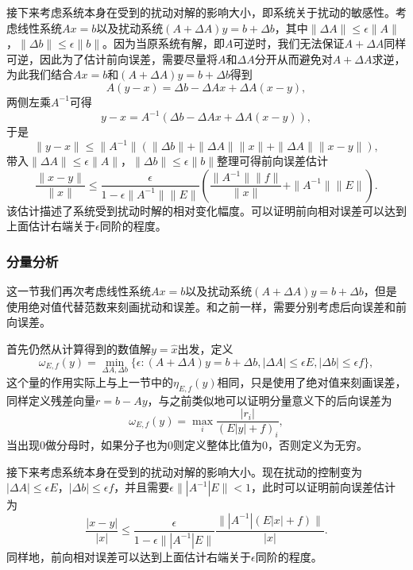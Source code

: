 \documentclass[a4paper,10pt]{ctexart}
\begin{document}
接下来考虑系统本身在受到的扰动对解的影响大小，即系统关于扰动的敏感性。考虑线性系统$ Ax=b $以及扰动系统$ (A+\Delta A)y = b + \Delta b $，其中$ \| \Delta A \| \leqslant \epsilon \| A \| $，$ \| \Delta b \| \leqslant \epsilon \| b \| $。因为当原系统有解，即$ A $可逆时，我们无法保证$ A+\Delta A $同样可逆，因此为了估计前向误差，需要尽量将$ A $和$ \Delta A $分开从而避免对$ A+\Delta A $求逆，为此我们结合$ Ax=b $和$ (A+\Delta A)y = b + \Delta b $得到
\[
    A(y-x) = \Delta b - \Delta A x + \Delta A (x-y),
\]
两侧左乘$ A^{-1} $可得
\[
    y-x = A^{-1}(\Delta b - \Delta A x + \Delta A (x-y)),
\]
于是
\[
    \| y-x \| \leqslant \| A^{-1} \| (\| \Delta b \| + \| \Delta A \| \| x \| + \| \Delta A \| \| x-y \|),  
\]
带入$ \| \Delta A \| \leqslant \epsilon \| A \| $，$ \| \Delta b \| \leqslant \epsilon \| b \| $整理可得前向误差估计
\begin{equation}
    \frac{\| x-y \|}{\| x \| } \leqslant \frac{\epsilon}{1-\epsilon \| A^{-1} \| \| E \|} \left( \frac{\| A^{-1} \| \| f \|}{\| x \|} + \| A^{-1} \| \| E \| \right).
\end{equation}
该估计描述了系统受到扰动时解的相对变化幅度。可以证明前向相对误差可以达到上面估计右端关于$ \epsilon $同阶的程度。

\subsubsection{分量分析}
这一节我们再次考虑线性系统$ Ax=b $以及扰动系统$ (A+\Delta A)y = b + \Delta b $，但是使用绝对值代替范数来刻画扰动和误差。和之前一样，需要分别考虑后向误差和前向误差。

首先仍然从计算得到的数值解$ y=\hat{x} $出发，定义
\begin{equation}
    \omega_{E,f}(y) = \min_{\Delta A, \Delta b}\{ \epsilon: (A+\Delta A)y = b+\Delta b, | \Delta A | \leqslant \epsilon E , | \Delta b | \leqslant \epsilon f \},
\end{equation}
这个量的作用实际上与上一节中的$ \eta_{E,f}(y) $相同，只是使用了绝对值来刻画误差，同样定义残差向量$ r = b - A y $，与之前类似地可以证明分量意义下的后向误差为
\begin{equation}
    \omega_{E,f}(y) = \max_i \frac{| r_i |}{(E | y | + f)_i},
\end{equation}
当出现0做分母时，如果分子也为0则定义整体比值为0，否则定义为无穷。

接下来考虑系统本身在受到的扰动对解的影响大小。现在扰动的控制变为$ | \Delta A | \leqslant \epsilon E $，$ | \Delta b | \leqslant \epsilon f $，并且需要$ \epsilon\| |A^{-1}|E \| < 1 $，此时可以证明前向误差估计为
\begin{equation}
    \frac{| x-y |}{| x |} \leqslant \frac{\epsilon}{1-\epsilon \| |A^{-1}|E \|}  \frac{\| |A^{-1}|(E|x|+f) \|}{| x |}.
\end{equation}
同样地，前向相对误差可以达到上面估计右端关于$ \epsilon $同阶的程度。
\end{document}
